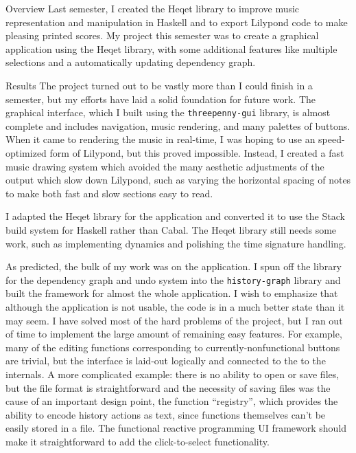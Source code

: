 \documentclass{article}
\begin{document}
\begin{section}{Overview}
Last semester, I created the Heqet library to improve music representation and manipulation in Haskell and to export Lilypond code to make pleasing printed scores. My project this semester was to create a graphical application using the Heqet library, with some additional features like multiple selections and a automatically updating dependency graph. 

\end{section}
\begin{section}{Results}
The project turned out to be vastly more than I could finish in a semester, but my efforts have laid a solid foundation for future work. The graphical interface, which I built using the \texttt{threepenny-gui} library, is almost complete and includes navigation, music rendering, and many palettes of buttons. When it came to rendering the music in real-time, I was hoping to use an speed-optimized form of Lilypond, but this proved impossible. Instead, I created a fast music drawing system which avoided the many aesthetic adjustments of the output which slow down Lilypond, such as varying the horizontal spacing of notes to make both fast and slow sections easy to read.

I adapted the Heqet library for the application and converted it to use the Stack build system for Haskell rather than Cabal. The Heqet library still needs some work, such as implementing dynamics and polishing the time signature handling.

As predicted, the bulk of my work was on the application. I spun off the library for the dependency graph and undo system into the \texttt{history-graph} library and built the framework for almost the whole application. I wish to emphasize that although the application is not usable, the code is in a much better state than it may seem. I have solved most of the hard problems of the project, but I ran out of time to implement the large amount of remaining easy features. For example, many of the editing functions corresponding to currently-nonfunctional buttons are trivial, but the interface is laid-out logically and connected to the to the internals. A more complicated example: there is no ability to open or save files, but the file format is straightforward and the necessity of saving files was the cause of an important design point, the function ``registry'', which provides the ability to encode history actions as text, since functions themselves can't be easily stored in a file. The functional reactive programming UI framework should make it straightforward to add the click-to-select functionality.

\end{section}
\end{document}
